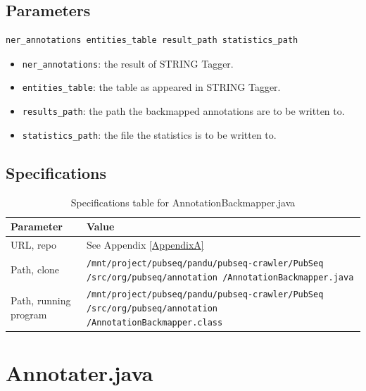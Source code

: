 \subsection{Parameters}

\begin{lstlisting}[breaklines]
ner_annotations entities_table result_path statistics_path
\end{lstlisting}

\begin{itemize}
\item \texttt{ner\_annotations}: the result of STRING Tagger.
\item \texttt{entities\_table}: the table as appeared in STRING Tagger.
\item \texttt{results\_path}: the path the backmapped annotations are to be written to.
\item \texttt{statistics\_path}: the file the statistics is to be written to.
\end{itemize}

\subsection{Specifications}

\begin{table}[htbp]
\caption{Specifications table for AnnotationBackmapper.java}
\centering
\begin{tabularx}{\textwidth}{ | l | X | }
  \hline
  Parameter & Value \\
  \hline
  URL, repo & See Appendix \ref{AppendixA} \\
  Path, clone & \texttt{/mnt/project/pubseq/pandu/pubseq-crawler/PubSeq /src/org/pubseq/annotation /AnnotationBackmapper.java} \\
  Path, running program & \texttt{/mnt/project/pubseq/pandu/pubseq-crawler/PubSeq /src/org/pubseq/annotation /AnnotationBackmapper.class}\\
  \hline
\end{tabularx}
\end{table}


\section{Annotater.java}

